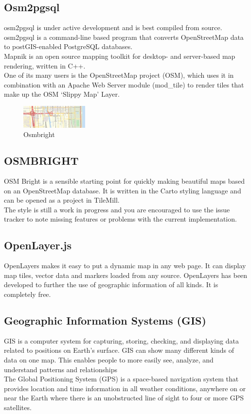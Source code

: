 \subsection{Osm2pgsql}
 osm2pgsql is under active development and is best compiled from source.\\
osm2pgsql is a command-line based program that converts OpenStreetMap data to postGIS-enabled PostgreSQL databases.\\
Mapnik is an open source mapping toolkit for desktop- and server-based map rendering, written in C++.\\
One of its many users is the OpenStreetMap project (OSM), which uses it in combination with an Apache Web Server module (mod\_tile) to render tiles that make up the OSM ‘Slippy Map’ Layer.\\
\begin{figure}[!ht]
\centering
\includegraphics[width=0.3\textwidth]{input/images/bright.jpeg}                   
\caption{Osmbright}
\hspace{-1.5em}
\end{figure}



\subsection{OSMBRIGHT}
OSM Bright is a sensible starting point for quickly making beautiful maps based on an OpenStreetMap database. It is written in the Carto styling language and can be opened as a project in TileMill.\\
The style is still a work in progress and you are encouraged to use the issue tracker to note missing features or problems with the current implementation.\\
\subsection{OpenLayer.js}
OpenLayers makes it easy to put a dynamic map in any web page. It can display map tiles, vector data and markers loaded from any source. OpenLayers has been developed to further the use of geographic information of all kinds. It is completely free.\\
\subsection{Geographic Information Systems (GIS)}
GIS is a computer system for capturing, storing, checking, and displaying data related to positions on Earth’s surface. GIS can show many different kinds of data on one map. This enables people to more easily see, analyze, and understand patterns and relationships\\
The Global Positioning System (GPS) is a space-based navigation system that provides location and time information in all weather conditions, anywhere on or near the Earth where there is an unobstructed line of sight to four or more GPS satellites.\\
